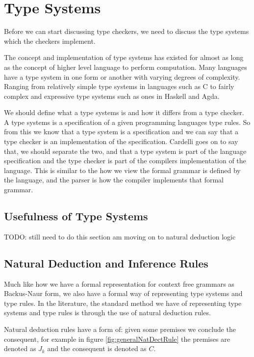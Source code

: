 \section{Type Systems}
Before we can start discussing type checkers, we need to discuss the type systems which the checkers implement.

The concept and implementation of type systems has existed for almost as long as the concept of higher level language to perform computation\cite{Backus:1978:HFI:960118.808380}.
Many languages have a type system in one form or another with varying degrees of complexity.
Ranging from relatively simple type systems in languages such as C to fairly complex and expressive type systems such as ones in Haskell and Agda.

We should define what a type systems is and how it differs from a type checker.
A type systems is a specification of a given programming languages type rules\cite{cardelli1996type}.
So from this we know that a type system is a specification and we can say that a type checker is an implementation of the specification.
Cardelli goes on to say that, we should separate the two, and that a type system is part of the language specification and the type checker is part of the compilers implementation of the language\cite{cardelli1996type}.
This is similar to the how we view the formal grammar is defined by the language, and the parser is how the compiler implements that formal grammar\cite{cardelli1996type}.

\subsection{Usefulness of Type Systems}
TODO: still need to do this section am moving on to natural deduction logic

\subsection{Natural Deduction and Inference Rules}

Much like how we have a formal representation for context free grammars as Backus-Naur form\cite{Backus1960,aho2003compilers,ranta2012implementing}, we also have a formal way of representing type systems and type rules.
In the literature, the standard method we have of representing type systems and type rules is through the use of natural deduction rules\cite{cardelli1996type,ranta2012implementing}.

Natural deduction rules have a form of: given some premises we conclude the consequent\cite{prawitz2006natural,ranta2012implementing}, for example in figure \ref{fig:generalNatDectRule} the premises are denoted as $J_k$ and the consequent is denoted as $C$.

